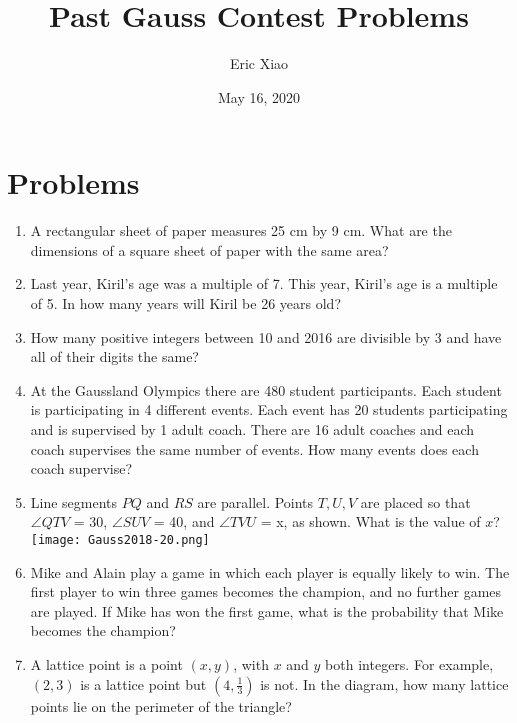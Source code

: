 \documentclass[12pt]{extarticle}
\title{Past Gauss Contest Problems}
\author{Eric Xiao}
\date{May 16, 2020}
\begin{document}
\maketitle

\section{Problems}
\begin{enumerate}
    \itemsep 2.0em
    \item {A rectangular sheet of paper measures 25 cm by 9 cm. What are the dimensions of a square sheet of paper with the same area?} %
    \item {Last year, Kiril's age was a multiple of 7. This year, Kiril's age is a multiple of 5. In how many years will Kiril be 26 years old?} %
    \item {How many positive integers between 10 and 2016 are divisible by 3 and have all of their digits the same?} %
    \item {At the Gaussland Olympics there are 480 student participants. Each student is participating in 4 different events. Each event has 20 students participating and is supervised by 1 adult coach. There are 16 adult coaches and each coach supervises the same number of events. How many events does each coach supervise?} %
    \item {Line segments $PQ$ and $RS$ are parallel. Points $T, U, V$ are placed so that $\angle QTV$ = 30\textdegree, $\angle SUV$ = 40\textdegree, and $\angle TVU$ = x\textdegree, as shown. What is the value of $x$?
    \\ \texttt{[image: Gauss2018-20.png]}} %
    \item {Mike and Alain play a game in which each player is equally likely to win. The first player to win three games becomes the champion, and no further games are played. If Mike has won the first game, what is the probability that Mike becomes the champion?} %
    \item {A lattice point is a point $(x, y)$, with $x$ and $y$ both integers. For example, $(2, 3)$ is a lattice point but $(4, \frac{1}{3})$ is not. In the diagram, how many lattice points lie on the perimeter of the triangle?
}
\end{enumerate}
\end{document}

